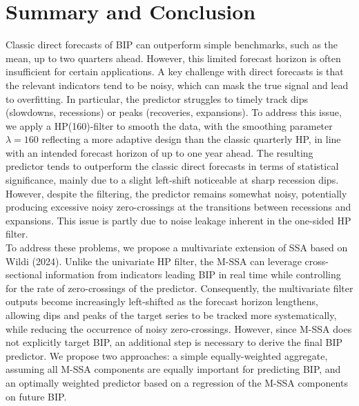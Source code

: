 \documentclass[a4paper]{article}
\begin{document}
\section{Summary and Conclusion}


Classic direct forecasts of BIP can outperform simple benchmarks, such as the mean, up to two quarters ahead. However, this limited forecast horizon is often insufficient for certain applications. A key challenge with direct forecasts is that the relevant indicators tend to be noisy, which can mask the true signal and lead to overfitting. In particular, the predictor struggles to timely track dips (slowdowns, recessions) or peaks (recoveries, expansions). To address this issue, we apply a HP(160)-filter to smooth the data, with the smoothing parameter $\lambda=160$ reflecting a more adaptive design than the classic quarterly HP, in line with an intended forecast horizon of up to one year ahead. The resulting predictor tends to outperform the classic direct forecasts in terms of statistical significance, mainly due to a slight left-shift noticeable at sharp recession dips. However, despite the filtering, the predictor remains somewhat noisy, potentially producing excessive noisy zero-crossings at the transitions between recessions and expansions. This issue is partly due to noise leakage inherent in the one-sided HP filter. \\

To address these problems, we propose a multivariate extension of SSA based on Wildi (2024). Unlike the univariate HP filter, the M-SSA can leverage cross-sectional information from indicators leading BIP in real time while controlling for the rate of zero-crossings of the predictor. Consequently, the multivariate filter outputs become increasingly left-shifted as the forecast horizon lengthens, allowing dips and peaks of the target series to be tracked more systematically, while reducing the occurrence of noisy zero-crossings. However, since M-SSA does not explicitly target BIP, an additional step is necessary to derive the final BIP predictor. We propose two approaches: a simple equally-weighted aggregate, assuming all M-SSA components are equally important for predicting BIP, and an optimally weighted predictor based on a regression of the M-SSA components on future BIP.\\
\end{document}
